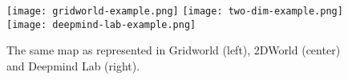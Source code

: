 \begin{figure}[t!]
\centering     
\def\figw{0.33\columnwidth}
\texttt{[image: gridworld-example.png]}%
\texttt{[image: two-dim-example.png]}%
\texttt{[image: deepmind-lab-example.png]}
\caption{The same map as represented in Gridworld (left), 2DWorld (center) and Deepmind Lab (right).}
\label{fig:environments}
\end{figure}
